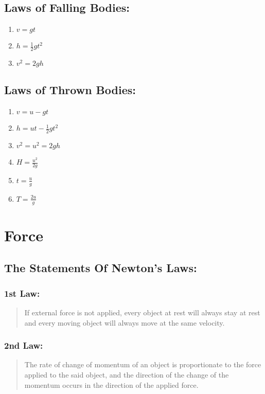 \documentclass[a4paper]{report}
\begin{document}
    \section{Laws of Falling Bodies: }
            \begin{enumerate}
                \item $ v = gt $
                \item $ h = \frac{1}{2}gt^2 $
                \item $ v^2 = 2gh $
            \end{enumerate}
    \section{Laws of Thrown Bodies: }
    \begin{enumerate}
        \item $ v = u - gt $
        \item $ h = ut - \frac{1}{2}gt^2 $
        \item $ v^2 = u^2 = 2gh $
        \item $ H = \frac{u^2}{2g} $
        \item $ t = \frac{u}{g} $
        \item $ T = \frac{2u}{g}$
    \end{enumerate}



\chapter{Force}
    \section{The Statements Of Newton's Laws: }
        \subsection{1st Law: }
            \begin{quotation}
                \item If external force is not applied, every object at rest will always stay at rest and every moving object will always move at the same velocity.
            \end{quotation}
        \subsection{2nd Law: }
            \begin{quotation}
                \item The rate of change of momentum of an object is proportionate to the force applied to the said object, and the direction of the change of the momentum occurs in the direction of the applied force.
            \end{quotation}
\end{document}
